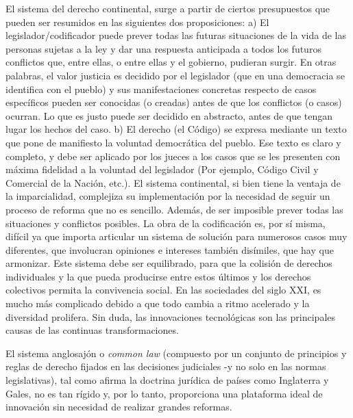 \documentclass[12pt]{report} %
\begin{document}
El sistema del derecho continental, surge a partir de ciertos presupuestos que pueden ser resumidos en las siguientes dos proposiciones: a) El legislador/codificador puede prever todas las futuras situaciones de la vida de las personas sujetas a la ley y dar una respuesta anticipada a todos los futuros conflictos que, entre ellas, o entre ellas y el gobierno, pudieran surgir. En otras palabras, el valor justicia es decidido por el legislador (que en una democracia se identifica con el pueblo) y sus manifestaciones concretas respecto de casos específicos pueden ser conocidas (o creadas) antes de que los conflictos (o casos) ocurran. Lo que es justo puede ser decidido en abstracto, antes de que tengan lugar los hechos del caso. b) El derecho (el Código) se expresa mediante un texto que pone de manifiesto la voluntad democrática del pueblo. Ese texto es claro y completo, y debe ser aplicado por los jueces a los casos que se les presenten con máxima fidelidad a la voluntad del legislador (Por ejemplo, Código Civil y Comercial de la Nación, etc.). El sistema continental, si bien tiene la ventaja de la imparcialidad, complejiza su implementación por la necesidad de seguir un proceso de reforma que no es sencillo. Además, de ser imposible prever todas las situaciones y conflictos posibles. La obra de la codificación es, por sí misma, difícil ya que importa articular un sistema de solución para numerosos casos muy diferentes, que involucran opiniones e intereses también disímiles, que  hay  que armonizar. Este sistema debe ser equilibrado, para que la colisión de derechos individuales y la que pueda producirse entre estos últimos y los derechos colectivos permita la convivencia social. En las sociedades del siglo XXI, es mucho más complicado debido a que todo cambia a ritmo acelerado y la diversidad prolifera. Sin duda, las innovaciones tecnológicas son las principales causas de las continuas transformaciones.

El sistema anglosajón o \textit{common  law}  (compuesto  por  un  conjunto  de principios y reglas de derecho fijados en las decisiones judiciales -y no solo en las normas legislativas), tal como afirma la doctrina jurídica de países como Inglaterra y Gales, no es tan rígido y, por lo tanto, proporciona una plataforma ideal de innovación sin necesidad de realizar grandes reformas. 
\end{document}
